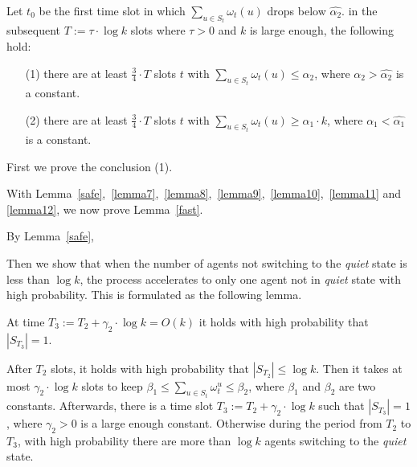 \begin{lemma}
    \label{lemma12}
    Let $t_0$ be the first time slot in which ${\sum}_{u\in S_t}\omega_t(u)$
    drops below $\hat{\alpha_2}$. in the subsequent $T :=\tau\cdot\log k$ slots
    where $\tau > 0$ and $k$ is large enough, the following hold:
    \begin{itemize}
        \item[(1)] there are at least $\frac{3}{4}\cdot T$ slots $t$
        with ${\sum}_{u\in S_t}\omega_t(u) \leq \alpha_2$, where $\alpha_2 > \hat{\alpha_2}$
        is a constant.
        \item[(2)] there are at least $\frac{3}{4}\cdot T$ slots $t$
        with ${\sum}_{u\in S_t}\omega_t(u) \geq \alpha_1\cdot k$, where $\alpha_1 < \hat{\alpha_1}$
        is a constant.
    \end{itemize}
\end{lemma}
\begin{IEEEproof}
    First we prove the conclusion (1).

\end{IEEEproof}

With Lemma~\ref{safe},~\ref{lemma7},~\ref{lemma8},~\ref{lemma9},~\ref{lemma10},~\ref{lemma11} and
\ref{lemma12}, we now prove Lemma~\ref{fast}.
\begin{IEEEproof}
    By Lemma~\ref{safe}, 
\end{IEEEproof}


Then we show that when the number of agents not switching to 
the \emph{quiet} state is less than $\log k$, the process accelerates to 
only one agent not in \emph{quiet} state with high probability.
This is formulated as the following lemma.

\begin{lemma}
    \label{slow}
    At time $T_3 :=T_2 +\gamma_2 \cdot \log k = O(k)$ it holds with high
    probability that $|S_{T_3}| = 1$.
\end{lemma}
\begin{IEEEproof}
    After $T_2$ slots, it holds with high probability 
    that $|S_{T_2}| \leq \log k$. Then it takes at most $\gamma_2 \cdot \log k$
    slots to keep $\beta_1 \leq \sum_{u\in S_t} \omega_t^u \leq \beta_2$,
    where $\beta_1$ and $\beta_2$ are two constants.
    Afterwards, there is a time slot $T_3 :=T_2 +\gamma_2\cdot\log k$ such that
    $|S_{T_3}| = 1$, where $\gamma_2 > 0$ is a large enough constant. 
    Otherwise during the period from $T_2$ to $T_3$,
    with high probability there are 
    more than $\log k$ agents switching to
    the \emph{quiet} state.
\end{IEEEproof}


